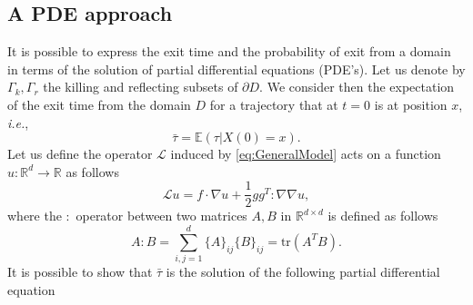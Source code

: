 \subsection{A PDE approach}\label{sec:PDEs}
It is possible to express the exit time and the probability of exit from a domain in terms of the solution of partial differential equations (PDE's).
Let us denote by $\Gamma_k,\Gamma_r$ the killing and reflecting subsets of $\partial D$. We consider then the expectation of the exit time from the domain $D$ for a trajectory that at $t=0$ is at position $x$, \textit{i.e.},
\begin{equation}\label{eq:ExpTau}
	\bar\tau = \mathbb{E}(\tau | X(0) = x).
\end{equation}
Let us define the operator $\mathcal L$ induced by \eqref{eq:GeneralModel} acts on a function $u\colon \mathbb{R}^d \rightarrow \mathbb{R}$  as follows
\begin{equation}\label{eq:LOperator}
	\mathcal Lu = f \cdot \nabla u + \frac{1}{2} gg^T : \nabla \nabla u,
\end{equation}
where the $:$ operator between two matrices $A,B$ in $\mathbb{R}^{d\times d}$ is defined as follows
\begin{equation}\label{eq:twoPoints}
	A : B = \sum_{i,j = 1}^d \{A\}_{ij}\{B\}_{ij} = \text{tr}(A^TB).
\end{equation}
It is possible to show \cite{Krumscheid2015,Pavliotis2014} that $\bar\tau$ is the solution of the following partial differential equation 


